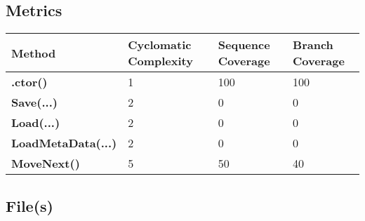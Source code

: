 \documentclass[a4paper,10pt]{article}
\begin{document}
\subsection{Metrics}
\begin{longtable}[l]{|l|l|l|l|}
\hline
\textbf{Method} & \textbf{Cyclomatic Complexity} & \textbf{Sequence Coverage} & \textbf{Branch Coverage}\\
\hline
\textbf{.ctor()} & 1 & 100 & 100\\
\hline
\textbf{Save(...)} & 2 & 0 & 0\\
\hline
\textbf{Load(...)} & 2 & 0 & 0\\
\hline
\textbf{LoadMetaData(...)} & 2 & 0 & 0\\
\hline
\textbf{MoveNext()} & 5 & 50 & 40\\
\hline
\end{longtable}
\subsection{File(s)}
\end{document}
